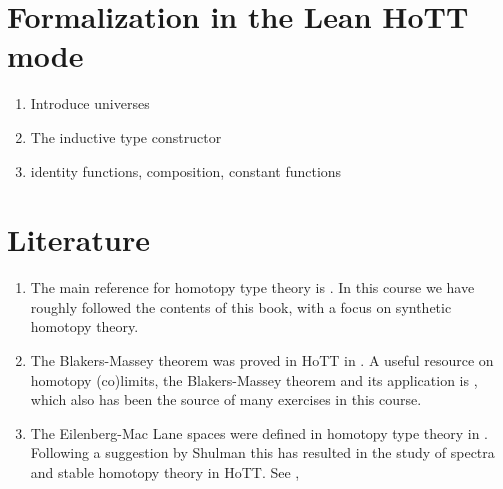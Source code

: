 \documentclass[11pt]{memoir} %
\begin{document}
\appendix

\chapter{Formalization in the Lean HoTT mode}
\begin{enumerate}
\item Introduce universes
\item The inductive type constructor
\item identity functions, composition, constant functions
\end{enumerate}

\chapter{Literature}
\begin{enumerate}
\item The main reference for homotopy type theory is \cite{hottbook}. In this course we have roughly followed the contents of this book, with a focus on synthetic homotopy theory. 
\item The Blakers-Massey theorem was proved in HoTT in \cite{hottBM}.
A useful resource on homotopy (co)limits, the Blakers-Massey theorem and its application is \cite{MunsonVolic}, which also has been the source of many exercises in this course.
\item The Eilenberg-Mac Lane spaces were defined in homotopy type theory in \cite{hottEM}. Following a suggestion by Shulman \cite{ShulmanCoh} this has resulted in the study of spectra and stable homotopy theory in HoTT. See \cite{CavalloCoh}, \cite{FavoniaPhD}
\end{enumerate}

\backmatter

\printbibliography

\printindex
\end{document}
